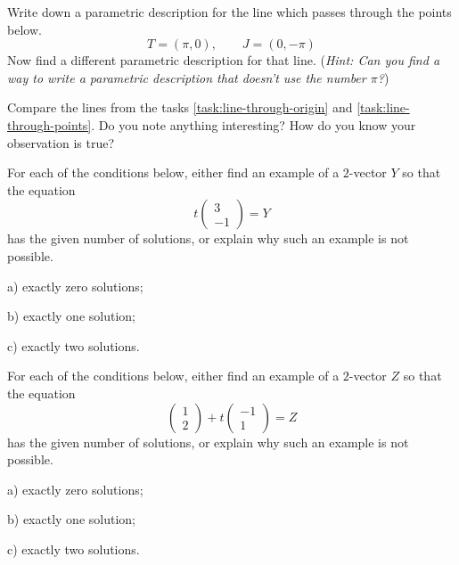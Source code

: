 \documentclass[cahier-main.tex]{subfiles}
\begin{document}
\begin{task}\label{task:line-through-points}
Write down a parametric description for the line which passes through the points below.
\[
 T = (\pi, 0), \qquad J = (0,-\pi)
\]
Now find a different parametric description for that line. (\emph{Hint: Can you find a way to write a parametric description that doesn't use the number $\pi$?})
\end{task}

\begin{task}
Compare the lines from the tasks \ref{task:line-through-origin} and \ref{task:line-through-points}. Do you note anything interesting? How do you know your observation is true?
\end{task}


\begin{task}
For each of the conditions below, either find an example of a $2$-vector $Y$ so that the equation
\[
t\begin{pmatrix}3\\-1\end{pmatrix} = Y
\]
has the given number of solutions, or explain why such an example is not possible.
\begin{compactitem}
\item[a)] exactly zero solutions;
\item[b)] exactly one solution; 
\item[c)] exactly two solutions.
\end{compactitem}
\end{task}



\begin{task}
For each of the conditions below, either find an example of a $2$-vector $Z$ so that the equation
\[
\begin{pmatrix}1\\2\end{pmatrix} + t\begin{pmatrix}-1\\1 \end{pmatrix} = Z
\]
has the given number of solutions, or explain why such an example is not possible.
\begin{compactitem}
\item[a)] exactly zero solutions;
\item[b)] exactly one solution; 
\item[c)] exactly two solutions.
\end{compactitem}
\end{task}
\end{document}
